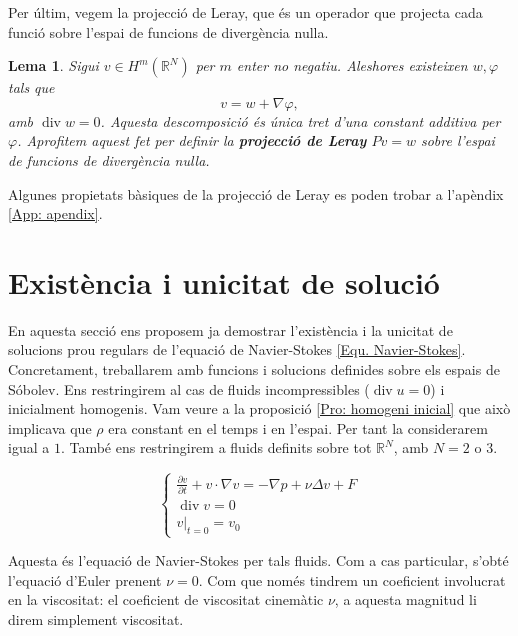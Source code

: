 \documentclass{article}
\numberwithin{equation}{section}
\DeclareMathOperator{\diver}{div}
\newtheorem{lema}{Lema}[section]
\begin{document}
Per \'{u}ltim, vegem la projecci\'{o} de Leray, que \'{e}s un operador que projecta cada funci\'{o} sobre l'espai de funcions de diverg\`{e}ncia nul\textperiodcentered la.

\begin{lema}\label{Lem: Leray original}
Sigui $v\in H^m(\mathbb{R}^N)$ per $m$ enter no negatiu. Aleshores existeixen $w,\varphi$ tals que
\begin{equation}
v=w+\nabla\varphi,
\end{equation}
amb $\diver w=0$. Aquesta descomposici\'{o} \'{e}s \'{u}nica tret d'una constant additiva per $\varphi$. Aprofitem aquest fet per definir la \textbf{projecci\'{o} de Leray} $Pv=w$ sobre l'espai de funcions de diverg\`{e}ncia nul\textperiodcentered la.
\end{lema}

Algunes propietats b\`{a}siques de la projecci\'{o} de Leray es poden trobar a l'ap\`{e}ndix \ref{App: apendix}.

\section{Exist\`{e}ncia i unicitat de soluci\'{o}}

En aquesta secci\'{o} ens proposem ja demostrar l'exist\`{e}ncia i la unicitat de solucions prou regulars de l'equaci\'{o} de Navier-Stokes \eqref{Equ. Navier-Stokes}. Concretament, treballarem amb funcions i solucions definides sobre els espais de S\'{o}bolev. Ens restringirem al cas de fluids incompressibles ($\diver u=0$) i inicialment homogenis. Vam veure a la proposici\'{o} \ref{Pro: homogeni inicial} que aix\`{o} implicava que $\rho$ era constant en el temps i en l'espai. Per tant la considerarem igual a $1$. Tamb\'{e} ens restringirem a fluids definits sobre tot $\mathbb{R}^N$, amb $N=2$ o $3$.

\begin{equation}\label{Equ. Navier-Stokes Majda-Bertozzi}
\left\{\begin{array}{l}\displaystyle{\frac{\partial v}{\partial t}+v\cdot\nabla v=-\nabla p+\nu\Delta v+F}\\\diver v=0\\v|_{t=0}=v_0\end{array}\right.
\end{equation}

Aquesta \'{e}s l'equaci\'{o} de Navier-Stokes per tals fluids. Com a cas particular, s'obt\'{e} l'equaci\'{o} d'Euler prenent $\nu=0$. Com que nom\'{e}s tindrem un coeficient involucrat en la viscositat: el coeficient de viscositat cinem\`{a}tic $\nu$, a aquesta magnitud li direm simplement viscositat.
\end{document}
